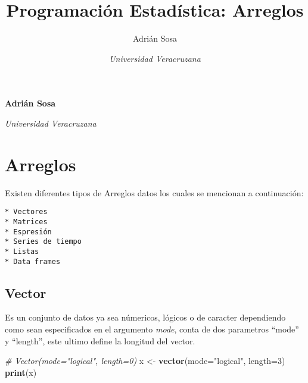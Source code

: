 \documentclass[11pt,]{article}
\title{Programación Estadística: Arreglos  }
\author{\Large Adrián Sosa\vspace{0.05in} \newline\normalsize\emph{}   \and \Large \vspace{0.05in} \newline\normalsize\emph{Universidad Veracruzana}  }
\date{}
\newcommand*{\authorfont}{\fontfamily{phv}\selectfont}
\newenvironment{Shaded}{\begin{snugshade}}{\end{snugshade}}
\newcommand{\CommentTok}[1]{\textcolor[rgb]{0.56,0.35,0.01}{\textit{#1}}}
\newcommand{\DataTypeTok}[1]{\textcolor[rgb]{0.13,0.29,0.53}{#1}}
\newcommand{\DecValTok}[1]{\textcolor[rgb]{0.00,0.00,0.81}{#1}}
\newcommand{\KeywordTok}[1]{\textcolor[rgb]{0.13,0.29,0.53}{\textbf{#1}}}
\newcommand{\NormalTok}[1]{#1}
\newcommand{\StringTok}[1]{\textcolor[rgb]{0.31,0.60,0.02}{#1}}
\begin{document}
	
%

{%
\setlength{\parindent}{0pt}
\thispagestyle{plain}
{\fontsize{18}{20}\selectfont\raggedright 
\maketitle  %

}

{
   \vskip 13.5pt\relax \normalsize\fontsize{11}{12} 
\textbf{\authorfont Adrián Sosa} \hskip 15pt \emph{\small }   \par \textbf{\authorfont } \hskip 15pt \emph{\small Universidad Veracruzana}   

}

}






\vskip -8.5pt



\noindent  

\hypertarget{arreglos}{%
\section{Arreglos}\label{arreglos}}

Existen diferentes tipos de Arreglos datos los cuales se mencionan a
continuación:

\begin{verbatim}
* Vectores
* Matrices
* Espresión
* Series de tiempo
* Listas
* Data frames
\end{verbatim}

\hypertarget{vector}{%
\subsection{Vector}\label{vector}}

Es un conjunto de datos ya sea númericos, lógicos o de caracter
dependiendo como sean especificados en el argumento \emph{mode}, conta
de dos parametros ``mode'' y ``length'', este ultimo define la longitud
del vector.

\begin{Shaded}
\begin{Highlighting}[]
\CommentTok{# Vector(mode="logical", length=0)}
\NormalTok{x <-}\StringTok{ }\KeywordTok{vector}\NormalTok{(}\DataTypeTok{mode=}\StringTok{"logical"}\NormalTok{, }\DataTypeTok{length=}\DecValTok{3}\NormalTok{)}
\KeywordTok{print}\NormalTok{(x)}
\end{Highlighting}
\end{Shaded}
\end{document}
